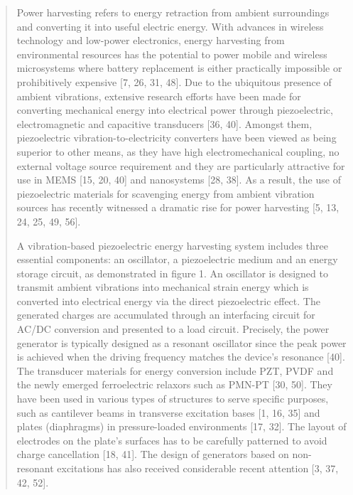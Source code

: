 \documentclass{article}
\begin{document}
\begin{quote}
    Power harvesting refers to energy retraction from ambient
    surroundings and converting it into useful electric energy. With
    advances in wireless technology and low-power electronics,
    energy harvesting from environmental resources has the
    potential to power mobile and wireless microsystems where
    battery replacement is either practically impossible or
    prohibitively expensive [7, 26, 31, 48]. Due to the ubiquitous
    presence of ambient vibrations, extensive research efforts
    have been made for converting mechanical energy into
    electrical power through piezoelectric, electromagnetic and
    capacitive transducers [36, 40]. Amongst them, piezoelectric
    vibration-to-electricity converters have been viewed as being
    superior to other means, as they have high electromechanical
    coupling, no external voltage source requirement and they
    are particularly attractive for use in MEMS [15, 20, 40] and
    nanosystems [28, 38]. As a result, the use of piezoelectric
    materials for scavenging energy from ambient vibration
    sources has recently witnessed a dramatic rise for power
    harvesting [5, 13, 24, 25, 49, 56].
    
    A vibration-based piezoelectric energy harvesting system
    includes three essential components: an oscillator, a
    piezoelectric medium and an energy storage circuit, as
    demonstrated in figure 1. An oscillator is designed to transmit
    ambient vibrations into mechanical strain energy which is
    converted into electrical energy via the direct piezoelectric
    effect. The generated charges are accumulated through an
    interfacing circuit for AC/DC conversion and presented to
    a load circuit. Precisely, the power generator is typically
    designed as a resonant oscillator since the peak power is
    achieved when the driving frequency matches the device’s
    resonance [40]. The transducer materials for energy conversion
    include PZT, PVDF and the newly emerged ferroelectric
    relaxors such as PMN-PT [30, 50]. They have been used in
    various types of structures to serve specific purposes, such as
    cantilever beams in transverse excitation bases [1, 16, 35] and
    plates (diaphragms) in pressure-loaded environments [17, 32].
    The layout of electrodes on the plate’s surfaces has to be
    carefully patterned to avoid charge cancellation [18, 41]. The
    design of generators based on non-resonant excitations has also
    received considerable recent attention [3, 37, 42, 52].
    

\end{quote}
\end{document}
